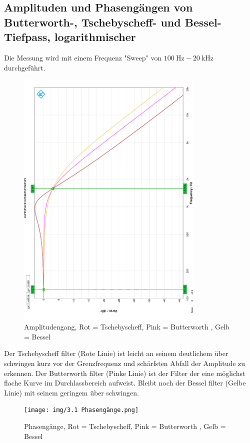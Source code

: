 \subsection{Amplituden und Phasengängen von Butterworth-, Tschebyscheff- und Bessel-Tiefpass, logarithmischer}
Die Messung wird mit einem Frequenz "Sweep" von $\SI{100}{\hertz}-\SI{20}{\kilo\hertz}$ durchgeführt.
\begin{figure}[H]
    \begin{center}
        \includegraphics[width=0.8\textwidth, angle =-90]{img/3.1 Amplitudengang.png}
        \caption{Amplitudengang, Rot = Tschebyscheff, Pink = Butterworth , Gelb = Bessel}
        \label{fig:A3_amp}
    \end{center}
\end{figure}
Der Tschebyscheff filter  (Rote Linie) ist leicht an seinem deutlichem über schwingen kurz vor der Grenzfrequenz und schärfsten Abfall der Amplitude zu erkennen. Der Butterworth filter (Pinke Linie) ist der Filter der eine möglichst flache Kurve im Durchlassbereich aufweist. Bleibt noch der Bessel filter (Gelbe Linie) mit seinem geringem über schwingen.

\begin{figure}[H]
    \begin{center}
        \texttt{[image: img/3.1 Phasengänge.png]} 
        \caption{Phasengänge, Rot = Tschebyscheff, Pink = Butterworth , Gelb = Bessel}
        \label{fig:A3_phase}
    \end{center}
\end{figure}

